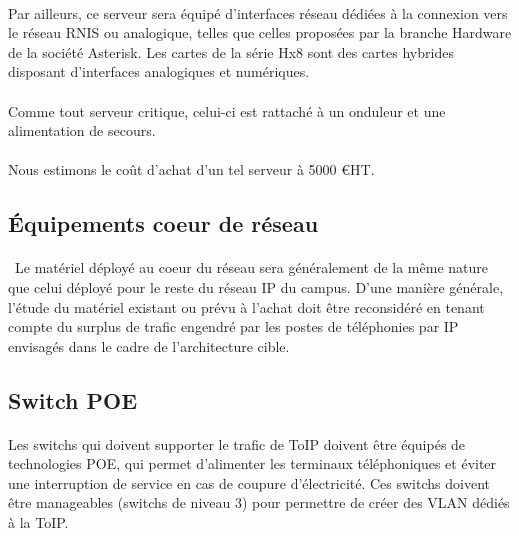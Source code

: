 \paragraph{} Par ailleurs, ce serveur sera équipé d'interfaces réseau dédiées à
la connexion vers le réseau \ac{RNIS} ou analogique, telles que celles proposées
par la branche Hardware de la société Asterisk. Les cartes de la série Hx8 sont
des cartes hybrides disposant d'interfaces analogiques et numériques.

\paragraph{} Comme tout serveur critique, celui-ci est rattaché à un onduleur et
une alimentation de secours.

\paragraph{} Nous estimons le coût d'achat d'un tel serveur à 5000 \euro HT.

\subsection{Équipements coeur de réseau}

\paragraph{} Le matériel déployé au coeur du réseau sera généralement de la même
nature que celui déployé pour le reste du réseau IP du campus. D'une manière
générale, l'étude du matériel existant ou prévu à l'achat doit être reconsidéré
en tenant compte du surplus de trafic engendré par les postes de téléphonies par
IP envisagés dans le cadre de l'architecture cible.

\subsection{Switch POE}

\paragraph{} Les switchs qui doivent supporter le trafic de ToIP doivent être
équipés de technologies \ac{POE}, qui permet d'alimenter les terminaux
téléphoniques et éviter une interruption de service en cas de coupure
d'électricité. Ces switchs doivent être manageables (switchs de niveau 3) pour
permettre de créer des VLAN dédiés à la ToIP.

